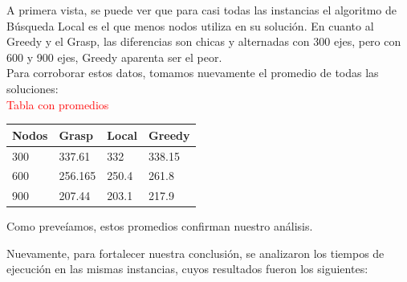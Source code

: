 A primera vista, se puede ver que para casi todas las instancias el algoritmo de B\'usqueda Local es el que menos nodos utiliza en su soluci\'on. 
En cuanto al Greedy y el Grasp, las diferencias son chicas y alternadas con 300 ejes, pero con 600 y 900 ejes, Greedy aparenta ser el peor.\\

Para corroborar estos datos, tomamos nuevamente el promedio de todas las soluciones:\\

\textcolor{red}{Tabla con promedios}
\begin{tabular}{| l | l | l | l |}
   \hline
   Nodos & Grasp & Local & Greedy\\ \hline
   300 & 337.61 & 332 & 338.15 \\ \hline
   600 & 256.165 & 250.4 & 261.8 \\ \hline
   900 & 207.44 & 203.1 & 217.9 \\
   \hline
\end{tabular}

Como preve\'iamos, estos promedios confirman nuestro an\'alisis.

Nuevamente, para fortalecer nuestra conclusión, se analizaron los tiempos de ejecución en las mismas instancias, cuyos resultados fueron los siguientes:

